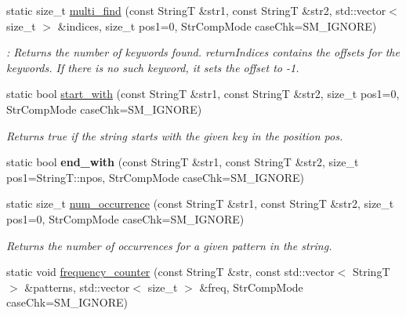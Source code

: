 \begin{CompactItemize}
\item 
\hypertarget{classAlgorithm_30a1876eb0482460a056c3f0d2e560a6}{
static size\_\-t \hyperlink{classAlgorithm_30a1876eb0482460a056c3f0d2e560a6}{multi\_\-find} (const StringT \&str1, const StringT \&str2, std::vector$<$ size\_\-t $>$ \&indices, size\_\-t pos1=0, StrCompMode caseChk=SM\_\-IGNORE)}
\label{classAlgorithm_30a1876eb0482460a056c3f0d2e560a6}

\begin{CompactList}\small\item\em : Returns the number of keywords found. returnIndices contains the offsets for the keywords. If there is no such keyword, it sets the offset to -1. \item\end{CompactList}\item 
\hypertarget{classAlgorithm_0d3d43dee9f6ba430a78ccff3420f5d3}{
static bool \hyperlink{classAlgorithm_0d3d43dee9f6ba430a78ccff3420f5d3}{start\_\-with} (const StringT \&str1, const StringT \&str2, size\_\-t pos1=0, StrCompMode caseChk=SM\_\-IGNORE)}
\label{classAlgorithm_0d3d43dee9f6ba430a78ccff3420f5d3}

\begin{CompactList}\small\item\em Returns true if the string starts with the given key in the position pos. \item\end{CompactList}\item 
\hypertarget{classAlgorithm_0f8e9305957158041cc5a845e2989e06}{
static bool \textbf{end\_\-with} (const StringT \&str1, const StringT \&str2, size\_\-t pos1=StringT::npos, StrCompMode caseChk=SM\_\-IGNORE)}
\label{classAlgorithm_0f8e9305957158041cc5a845e2989e06}

\item 
\hypertarget{classAlgorithm_0ad0b8ced47c0e8a1f4f3b4917c83735}{
static size\_\-t \hyperlink{classAlgorithm_0ad0b8ced47c0e8a1f4f3b4917c83735}{num\_\-occurrence} (const StringT \&str1, const StringT \&str2, size\_\-t pos1=0, StrCompMode caseChk=SM\_\-IGNORE)}
\label{classAlgorithm_0ad0b8ced47c0e8a1f4f3b4917c83735}

\begin{CompactList}\small\item\em Returns the number of occurrences for a given pattern in the string. \item\end{CompactList}\item 
\hypertarget{classAlgorithm_f1b3631037e8c4beb03f85e05ac27595}{
static void \hyperlink{classAlgorithm_f1b3631037e8c4beb03f85e05ac27595}{frequency\_\-counter} (const StringT \&str, const std::vector$<$ StringT $>$ \&patterns, std::vector$<$ size\_\-t $>$ \&freq, StrCompMode caseChk=SM\_\-IGNORE)}
\label{classAlgorithm_f1b3631037e8c4beb03f85e05ac27595}


\end{CompactItemize}
